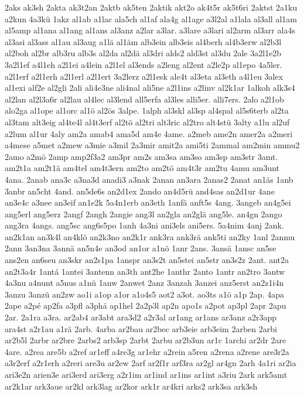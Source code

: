 {2aks
ak3sh
2akta
ak3t2an
2aktb
ak5ten
2aktik
akt2o
ak4t5r
ak5t6ri
2aktst
2a1ku
a2kun
4a3kü
1akz
al1ab
a1lac
ala5ch
al1af
ala4g
al1age
a3l2al
a1lala
al3all
al1am
al5amp
al1ana
al1ang
al1ans
al3anz
a2lar
a3lar.
a3lare
a3lari
al2arm
al3arr
ala4s
al3asi
al3ass
al1au
al3aug
a1lä
al1äm
alb3ein
alb3eis
al4berh
al4b3erw
al2b3l
al2boh
al2br
alb3ru
alb3s
al2da
al2dä
al3dri
alds2
ald3st
al3du
2ale
3a2l1e2b
3a2l1ef
a4l1eh
a2l1ei
a4lein
a2l1el
al3ends
a2leng
al2ent
a2le2p
al1epo
4a5ler.
a2l1erf
a2l1erh
a2l1erl
a2l1ert
3a2lerz
a2l1esk
ale4t
al3eta
al3eth
a4l1eu
3alex
al1exi
alf2e
al2gli
2ali
ali4e3ne
ali4nal
ali5ne
a2l1ins
a2linv
al2k1ar
1alkoh
alk3s4
al2lan
al2l3a6r
al2lau
al4lec
al3lend
all5erfa
al3les
alli5er.
alli7ers.
2alo
a2l1ob
alo2ga
al1ope
al1orc
al1ö
al2ös
3alpe.
1alph
al3skl
al3sp
al4spal
al5s6terb
al2ta
al3tam
alt3eig
al4te4l
al4t3erf
al2tö
al2tri
alt3ric
al2tro
alt4stü
3alty
a1lu
al2uf
a2lum
al1ur
4aly
am2a
amab4
ama5d
am4e
4ame.
a2meb
ame2n
amer2a
a2meri
a4mese
a5met
a2mew
a3mie
a3mil
2a3mir
amit2a
ami5ti
2ammal
am2min
ammu2
2amo
a2mö
2amp
amp2f3a2
am3pr
am2s
am3sa
am3so
am3sp
am3str
3amt.
am2t1a
am2t1ä
am4tel
am4t3ern
am2to
am2tö
am4t3r
am2tu
4amu
am3unt
4ana.
2anab
ana3c
a3na3d
anadi3
a3nak
2anan
an3ara
2anas2
2anat
an1äs
1anb
3anbr
an5cht
4and.
an5de6s
an2d1ex
2ando
an4d5rü
and4sas
an2d1ur
4ane
an3e4c
a3nee
an3eif
an1e2k
5a4n1erb
an3eth
1anfä
anft5s
4ang.
3angeb
an4g5ei
ang5erl
ang5erz
2angf
2angh
2angie
ang3l
an2gla
an2glä
ang5le.
an4gn
2ango
ang3ra
4angs.
ang5sc
ang6s5po
1anh
4a3ni
ani3els
ani5ers.
5a4nim
4anj
2ank.
an2k1an
an3k4l
an4klö
an2k3no
an2k1r
ank3ra
ank3rä
ank5ti
an2ky
1anl
2anmu
2ann
3an3na
3annä
an5n4e
an3od
an1or
a1nö
1anr
2ans.
3ansä
1ansc
an5se
ans2en
an6seu
an3skr
an2s1pa
1anspr
an3s2t
an5stei
an5str
an3s2z
2ant.
ant2a
an2t3a4r
1antá
1antei
3antenn
an3th
ant2he
1anthr
2anto
1antr
an2tro
3antw
4a3nu
a4nunt
a5nus
a1nü
1anw
2anwet
2anz
3anzah
3anzei
anz5erst
an2z1i4n
3anzu
3anzü
an2zw
ao1i
a1op
a1or
a1o4s5
aot2
a3ot.
ao3ts
a1ö
a1p
2ap.
4apa
2ape
a2pé
ap2fa
a3pfl
a3phä
ap1hel
2a2p3l
ap2n
apo1s
a2pot
ap3pl
2apr
2apu
2ar.
2a1ra
a3ra.
ar2ab4
ar3abt
ara3d2
a2r3al
ar1ang
ar1ans
ar3anz
a2r3app
ara4st
a2r1au
a1rä
2arb.
4arba
ar2bau
ar2bec
arb3eie
arb3eim
2arben
2arbi
ar2b5l
2arbr
ar2bre
2arbs2
arb3sp
2arbt
2arbu
ar2b3un
ar1c
1archi
ar2dr
2are
4are.
a2rea
are5b
a2ref
ar1eff
a4re3g
ar1ehr
a2rein
a5ren
a2rena
a2rene
are3r2a
a3r2erf
a2r1erh
a2reri
are3u
ar2ew
2arf
ar2f1r
arf3ra
ar2gl
ar4gn
2arh
4a1ri
ar2ia
ari3e2n
arien3e
ari3erd
ari3erg
a2r1im
ar1ind
ar1ins
ar1int
a3riu
2ark
ark5amt
ar2k1ar
ark3aue
ar2kl
ark3lag
ar2kor
ark1r
ar4kri
arks2
ark3sa
ark3sh
}
